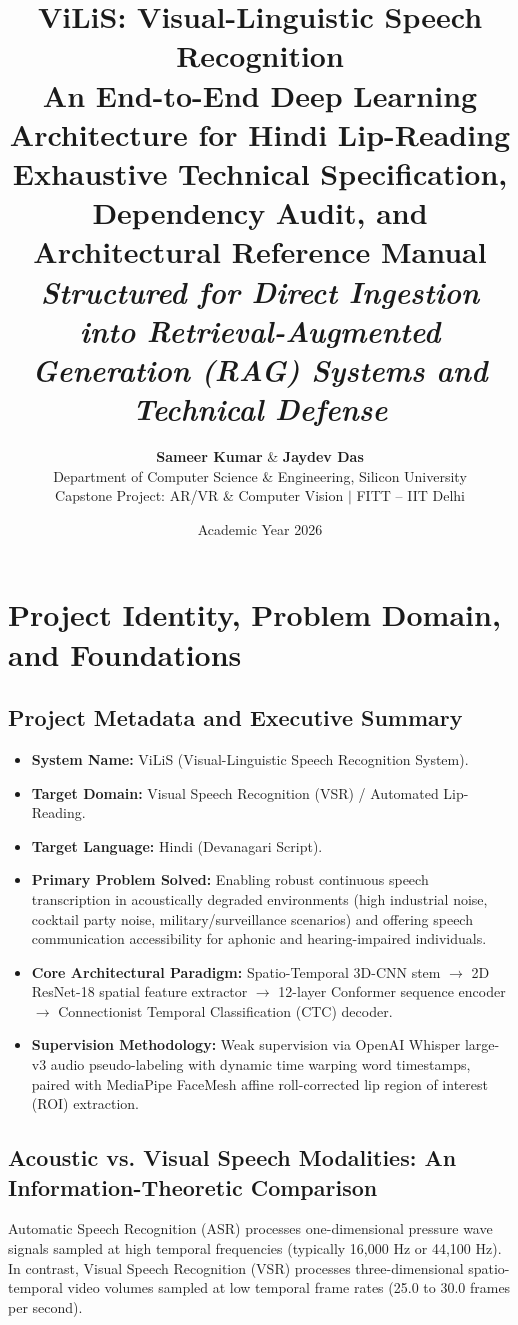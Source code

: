 \documentclass[11pt,a4paper]{report}
\title{\textbf{\Huge ViLiS: Visual-Linguistic Speech Recognition}\\[0.6em]
\Large An End-to-End Deep Learning Architecture for Hindi Lip-Reading\\[0.8em]
\normalsize \textbf{Exhaustive Technical Specification, Dependency Audit, and Architectural Reference Manual}\\[0.4em]
\small \textit{Structured for Direct Ingestion into Retrieval-Augmented Generation (RAG) Systems and Technical Defense}}
\author{\textbf{Sameer Kumar} \& \textbf{Jaydev Das}\\
Department of Computer Science \& Engineering, Silicon University\\
Capstone Project: AR/VR \& Computer Vision $\vert$ FITT -- IIT Delhi}
\date{Academic Year 2026}
\begin{document}
\maketitle
\tableofcontents
\newpage

\chapter{Project Identity, Problem Domain, and Foundations}

\section{Project Metadata and Executive Summary}
\begin{itemize}
    \item \textbf{System Name:} ViLiS (Visual-Linguistic Speech Recognition System).
    \item \textbf{Target Domain:} Visual Speech Recognition (VSR) / Automated Lip-Reading.
    \item \textbf{Target Language:} Hindi (Devanagari Script).
    \item \textbf{Primary Problem Solved:} Enabling robust continuous speech transcription in acoustically degraded environments (high industrial noise, cocktail party noise, military/surveillance scenarios) and offering speech communication accessibility for aphonic and hearing-impaired individuals.
    \item \textbf{Core Architectural Paradigm:} Spatio-Temporal 3D-CNN stem $\to$ 2D ResNet-18 spatial feature extractor $\to$ 12-layer Conformer sequence encoder $\to$ Connectionist Temporal Classification (CTC) decoder.
    \item \textbf{Supervision Methodology:} Weak supervision via OpenAI Whisper large-v3 audio pseudo-labeling with dynamic time warping word timestamps, paired with MediaPipe FaceMesh affine roll-corrected lip region of interest (ROI) extraction.
\end{itemize}

\section{Acoustic vs. Visual Speech Modalities: An Information-Theoretic Comparison}
Automatic Speech Recognition (ASR) processes one-dimensional pressure wave signals sampled at high temporal frequencies (typically 16,000 Hz or 44,100 Hz). In contrast, Visual Speech Recognition (VSR) processes three-dimensional spatio-temporal video volumes sampled at low temporal frame rates (25.0 to 30.0 frames per second).
\end{document}
